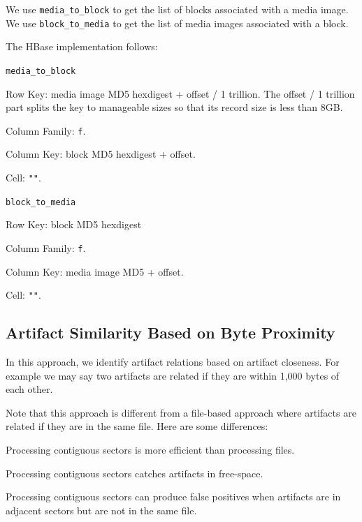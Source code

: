 \documentclass[12pt,twoside]{article}
\begin{document}
We use \verb+media_to_block+ to get the list of blocks associated with a media image.
We use \verb+block_to_media+ to get the list of media images associated with a block.

The HBase implementation follows:
\begin{compactitem}
\item \verb+media_to_block+
  \begin{compactitem}
  \item Row Key: media image MD5 hexdigest + offset / 1 trillion. The offset / 1 trillion part splits the key to manageable sizes so that its record size is less than 8GB.
  \item Column Family: \verb+f+.
  \item Column Key: block MD5 hexdigest + offset.
  \item Cell: \verb+""+.
  \end{compactitem}
\item \verb+block_to_media+
  \begin{compactitem}
  \item Row Key: block MD5 hexdigest
  \item Column Family: \verb+f+.
  \item Column Key: media image MD5 + offset.
  \item Cell: \verb+""+.
  \end{compactitem}
\end{compactitem}

\subsection{Artifact Similarity Based on Byte Proximity}
In this approach, we identify artifact relations based on artifact closeness. For example we may say two artifacts are related if they are within 1,000 bytes of each other.

Note that this approach is different from a file-based approach where artifacts are related if they are in the same file. Here are some differences:

\begin{compactitem}
\item Processing contiguous sectors is more efficient than processing files.
\item Processing contiguous sectors catches artifacts in free-space.
\item Processing contiguous sectors can produce false positives when artifacts are in adjacent sectors but are not in the same file.
\end{compactitem}
\end{document}
